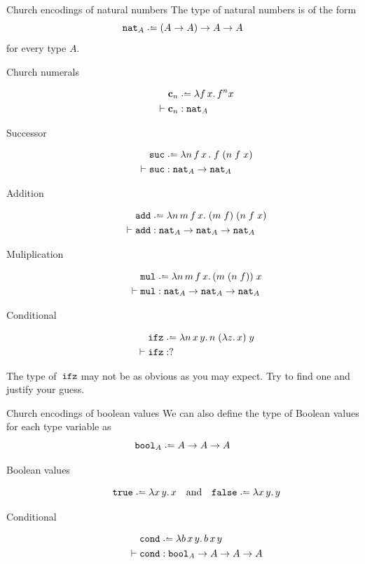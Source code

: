 \begin{frame}[allowframebreaks]{Church encodings of natural numbers}
The type of natural numbers is of the form
\[
  \nat_A \defeq (A \to A) \to A \to A
\]
for every type $A$.
  
  \begin{description}
    \item[Church numerals]
      \begin{align*}
        & \bc_n \defeq \lambda f\,x.\,
        f^n x \\
        \vdash{} & \bc_n : \nat_A
      \end{align*}
    \item[Successor]
      \begin{align*}
        & \suc \defeq \lambda n \,f\,x\,.\;f\;(n\;f\;x) \\
        \vdash{} & \suc : \nat_A \to \nat_A
      \end{align*}
    \item[Addition]
      \begin{align*}
        & \add \defeq \lambda n\,m\,f\,x.\; (m\;f)\;(n\;f\;x) \\
        \vdash{} & \add : \nat_A \to \nat_A \to \nat_A
      \end{align*}
    \item[Muliplication] 
      \begin{align*}
        & \mul \defeq \lambda n\,m\,f\,x.\, (m\;(n\;f))\;x\\
      \vdash{} & \mul : \nat_A \to \nat_A \to \nat_A
      \end{align*}
    \item[Conditional]
      \begin{align*}
        & \ifz \defeq \lambda n\,x\,y.\, n\;(\lambda z.\, x)\;y\\
        \vdash {} & \ifz : ?
      \end{align*}
  \end{description}
The type of~$\mathtt{ifz}$ may not be as obvious as you may expect.
Try to find one and justify your guess.

\end{frame}
\begin{frame}{Church encodings of boolean values}
We can also define the type of Boolean values 
for each type variable as
\[
  \bool_A \defeq A \to A \to A
\]
\begin{description}
  \item[Boolean values]
      \[
        \true \defeq \lambda x\,y.\,x 
        \quad\text{and}\quad
        \false \defeq \lambda x\,y.\,y 
      \]
  \item[Conditional]
    \begin{align*}
      & \cond \defeq \lambda b\,x\,y.\, b\,x\,y\\
      \vdash {} & \cond : \bool_{A} \to A \to A \to A
    \end{align*}
\end{description}
\end{frame}

